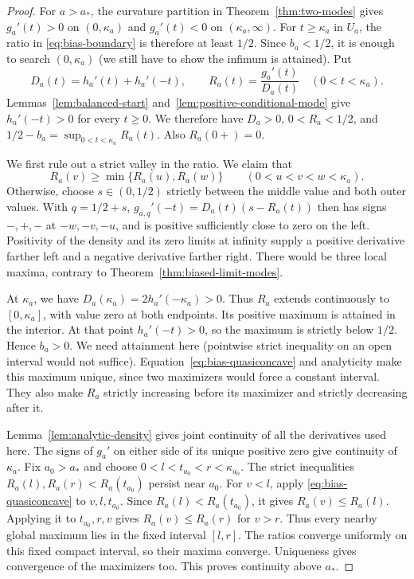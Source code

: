 \begin{proof}
For $a>a_*$, the curvature partition in Theorem~\ref{thm:two-modes}
gives $g_a'(t)>0$ on $(0,\kappa_a)$ and $g_a'(t)<0$ on
$(\kappa_a,\infty)$. For $t\ge\kappa_a$ in $U_a$, the ratio in
\eqref{eq:bias-boundary} is therefore at least $1/2$.
Since $b_a<1/2$, it is enough to search $(0,\kappa_a)$
(we still have to show the infimum is attained).
Put
\[
 D_a(t)=h_a'(t)+h_a'(-t),\qquad
 R_a(t)=\frac{g_a'(t)}{D_a(t)}\quad(0<t<\kappa_a).
\]
Lemmas~\ref{lem:balanced-start} and~\ref{lem:positive-conditional-mode}
give $h_a'(-t)>0$ for every $t\ge0$.
We therefore have $D_a>0$, $0<R_a<1/2$, and
$1/2-b_a=\sup_{0<t<\kappa_a}R_a(t)$. Also $R_a(0+)=0$.

We first rule out a strict valley in the ratio. We claim that
\begin{equation}\label{eq:bias-quasiconcave}
 R_a(v)\ge\min\{R_a(u),R_a(w)\}
 \qquad(0<u<v<w<\kappa_a).
\end{equation}
Otherwise, choose $s\in(0,1/2)$ strictly between the middle value
and both outer values. With $q=1/2+s$,
$g_{a,q}'(-t)=D_a(t)(s-R_a(t))$ then has signs $-,+,-$
at $-w,-v,-u$, and is positive sufficiently close to zero on the left.
Positivity of the density
and its zero limits at infinity supply a positive derivative farther
left and a negative derivative farther right. There would be three
local maxima, contrary to Theorem~\ref{thm:biased-limit-modes}.

At $\kappa_a$, we have $D_a(\kappa_a)=2h_a'(-\kappa_a)>0$.
Thus $R_a$ extends continuously to $[0,\kappa_a]$, with value
zero at both endpoints. Its positive maximum is attained in the
interior. At that point $h_a'(-t)>0$, so the maximum is strictly
below $1/2$. Hence $b_a>0$. We need attainment here (pointwise strict
inequality on an open interval would not suffice).
Equation~\eqref{eq:bias-quasiconcave} and analyticity make this
maximum unique, since two maximizers would force a constant interval.
They also make $R_a$ strictly increasing before its maximizer and
strictly decreasing after it.

Lemma~\ref{lem:analytic-density} gives joint continuity of all the
derivatives used here. The signs of $g_a'$ on either side of its
unique positive zero give continuity of $\kappa_a$. Fix $a_0>a_*$
and choose
$0<l<t_{a_0}<r<\kappa_{a_0}$. The strict inequalities
$R_a(l),R_a(r)<R_a(t_{a_0})$ persist near $a_0$.
For $v<l$, apply \eqref{eq:bias-quasiconcave} to
$v,l,t_{a_0}$. Since $R_a(l)<R_a(t_{a_0})$, it gives
$R_a(v)\le R_a(l)$. Applying it to $t_{a_0},r,v$ gives
$R_a(v)\le R_a(r)$ for $v>r$.
Thus every nearby global maximum lies in the fixed interval $[l,r]$.
The ratios converge uniformly on this fixed compact interval,
so their maxima converge. Uniqueness gives convergence of the
maximizers too. This proves continuity above $a_*$.


\end{proof}
